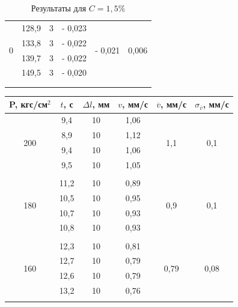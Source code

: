 \documentclass[a4paper, 12pt]{article}%
\begin{document}
\begin{enumerate}
\begin{longtable} {|c|c|c|c|c|c|}
		
		\multirow{4}{*}{0}& 128,9 & 3 & - 0,023 &  \multirow{4}{*}{- 0,021}    & \multirow{4}{*}{0,006}\\ \cline{2-4}
		& 133,8 & 3 &    - 0,022         &               &\\ \cline{2-4}
		& 139,7 & 3 &    - 0,022         &              & \\ \cline{2-4}
		& 149,5 & 3 &   - 0,020           &             &\\ \hline
		&&&&&\\ \hline
		\caption{Результаты для $ C = 1,5\% $  }
	\end{longtable}
	
	
	\newpage
	
	
		\begin{longtable} {|c|c|c|c|c|c|}
		\hline
		P, кгс/см$^2$ & $ t $, с &   $ \Delta l$, мм  & $v$,  мм/с   & $\overline v $, мм/с & $\sigma_{\overline v}$, мм/с\\ \hline
		\multirow{4}{*}{200}& 9,4 & 10 & 1,06 &  \multirow{4}{*}{1,1}    & \multirow{4}{*}{0,1}\\ \cline{2-4}
		& 8,9 & 10 &   1,12         &               &\\ \cline{2-4}
		& 9,4 & 10 &     1,06         &              & \\ \cline{2-4}
		& 9,5 & 10 &    1,05           &             &\\ \hline
		&&&&&\\ \hline
		
		\multirow{4}{*}{180}& 11,2 & 10 & 0,89 &  \multirow{4}{*}{0,9}    & \multirow{4}{*}{0,1}\\ \cline{2-4}
		& 10,5 & 10 &    0,95         &               &\\ \cline{2-4}
		& 10,7 & 10 &     0,93         &              & \\ \cline{2-4}
		& 10,8 & 10 &    0,93           &             &\\ \hline
		&&&&&\\ \hline
		
		\multirow{4}{*}{160}& 12,3 & 10 & 0,81 &  \multirow{4}{*}{0,79}    & \multirow{4}{*}{0,08}\\ \cline{2-4}
		& 12,7 & 10 &    0,79         &               &\\ \cline{2-4}
		& 12,6 & 10 &     0,79         &              & \\ \cline{2-4}
		& 13,2 & 10 &    0,76           &             &\\ \hline
		&&&&&\\ \hline
		

\end{longtable}
\end{enumerate}
\end{document}
